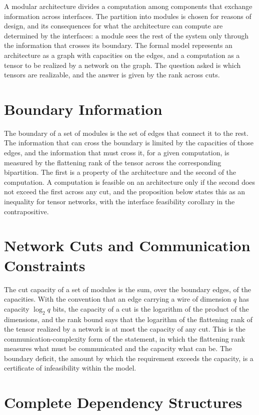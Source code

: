 \documentclass[11pt,letterpaper]{report}
\theoremstyle{plain}
\theoremstyle{definition}
\theoremstyle{remark}
\begin{document}
A modular architecture divides a computation among components that exchange information across interfaces. The partition into modules is chosen for reasons of design, and its consequences for what the architecture can compute are determined by the interfaces: a module sees the rest of the system only through the information that crosses its boundary. The formal model represents an architecture as a graph with capacities on the edges, and a computation as a tensor to be realized by a network on the graph. The question asked is which tensors are realizable, and the answer is given by the rank across cuts.

\section{Boundary Information}

The boundary of a set of modules is the set of edges that connect it to the rest. The information that can cross the boundary is limited by the capacities of those edges, and the information that must cross it, for a given computation, is measured by the flattening rank of the tensor across the corresponding bipartition. The first is a property of the architecture and the second of the computation. A computation is feasible on an architecture only if the second does not exceed the first across any cut, and the proposition below states this as an inequality for tensor networks, with the interface feasibility corollary in the contrapositive.

\section{Network Cuts and Communication Constraints}

The cut capacity of a set of modules is the sum, over the boundary edges, of the capacities. With the convention that an edge carrying a wire of dimension $q$ has capacity $\log_2q$ bits, the capacity of a cut is the logarithm of the product of the dimensions, and the rank bound says that the logarithm of the flattening rank of the tensor realized by a network is at most the capacity of any cut. This is the communication-complexity form of the statement, in which the flattening rank measures what must be communicated and the capacity what can be. The boundary deficit, the amount by which the requirement exceeds the capacity, is a certificate of infeasibility within the model.

\section{Complete Dependency Structures}
\end{document}
